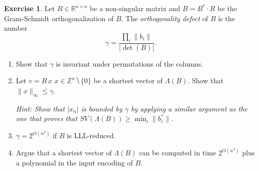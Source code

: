\documentclass[12pt,a4paper]{article}
\theoremstyle{plain}
\newtheorem*{Sol*}{Solution}
\theoremstyle{definition}
\newtheorem{Ex}{Exercise}
\newif\ifsolutions
\newcommand{\exercise}[2]{
			\begin{Ex} #1 \end{Ex}
			\ifsolutions  \begin{Sol*} #2 \end{Sol*} \bigskip \else \bigskip  \fi
		}
\begin{document}
\exercise{
  Let $Β∈ ℝ^{n ×n}$ be a non-singular matrix and $B = B^* ⋅ R$ be the Gram-Schmidt orthogonalization  of $B$. The \emph{orthogonality defect} of $B$ is the number
  \begin{displaymath}
    γ = \frac{∏_i \| b_i \|}{|\det(B)|}.  
  \end{displaymath}

  \begin{enumerate}
  \item Show that $γ$ is invariant under permutations of the columns. 
  \item Let $v = B \,x$ $x ∈ ℤ^n ⧹\{0\}$ be a shortest vector of $Λ(B)$. Show that $\|x\|_∞ ≤ γ$.

    {\scriptsize \emph{Hint: Show that $|x_n|$ is bounded by $γ$ by applying a similar argument as the one that proves that $SV(Λ(B))≥ \min_i \|b_i^*\|$.}}
  \item $γ = 2^{O(n^2)}$ if $B$ is LLL-reduced.
  \item Argue that a shortest vector of $Λ(B)$ can be computed in time $2^{O(n^3)}$ plus  a polynomial in the input encoding of $B$. 
  \end{enumerate}
}{}
\end{document}
